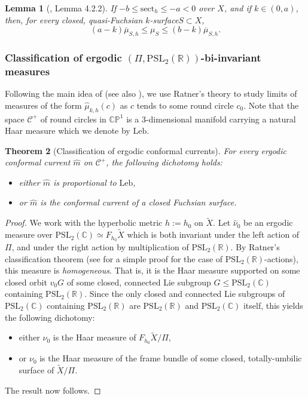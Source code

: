 \documentclass[11pt]{article}
\newcommand{\ksurface}{$k$\nobreakdash-surface\xspace}
\theoremstyle{plain}
\newtheorem{theorem}{Theorem}[section]
\newtheorem{lemma}[theorem]{Lemma}
\theoremstyle{definition}
\newcommand\PSL{\mathrm{PSL}_2(\mathbb{R})}
\newcommand\PSLc{\mathrm{PSL}_2(\mathbb{C})}
\newcommand\CP{\C\PP^1}
\newcommand{\C}{{\mathbb C}}
\newcommand{\PP}{{\mathbb P}}
\newcommand{\cC}{{\mathcal C}}
\let\dans\subset
\newcommand{\Leb}{\mathrm{Leb}}
\newcommand{\sect}{\mathrm{sect}}
\begin{document}
\begin{lemma}[\cite{ALS}, Lemma 4.2.2]\label{lem_comparison_area_laminar}
If $-b\leq \sect_h\leq -a<0$ over $X$, and if $k\in(0,a)$, then, for every closed, quasi-Fuchsian \ksurface $S\dans X$,
\begin{equation*}
(a-k)\overline{\mu}_{S,h}\leq\mu_S\leq(b-k)\overline{\mu}_{S,h}.
\end{equation*}
\end{lemma}

\subsubsection{Classification of ergodic $(\Pi,\PSL)$-bi-invariant measures}

Following the main idea of \cite{CMN} (see also \cite{LabourieBourbaki}), we use Ratner's theory to study limits of measures of the form $\hat\mu_{k,h}(c)$ as $c$ tends to some round circle $c_0$. Note that the space $\cC^+$ of round circles in $\CP$ is a $3$\nobreakdash-dimensional manifold carrying a natural Haar measure which we denote by $\Leb$.

\begin{theorem}[Classification of ergodic conformal currents]
\label{thm.Ratner} For every ergodic conformal current $\hat m$ on $\cC^+$, the following dichotomy holds:
\begin{itemize}
\item either $\hat m$ is proportional to $\Leb$,
\item or $\hat m$ is the conformal current of a closed Fuchsian surface.
\end{itemize}
\end{theorem}

\begin{proof}
We work with the hyperbolic metric $h:=h_0$ on $\tilde{X}$. Let $\hat\nu_0$ be an ergodic measure over $\PSLc\simeq F_{h_0}\tilde{X}$ which is both invariant under the left action of $\Pi$, and under the right action by multiplication of $\PSL$. By Ratner's classification theorem \cite{Ratner_Duke} (see \cite{Einsiedler} for a simple proof for the case of $\PSL$-actions), this measure is \emph{homogeneous}. That is, it is the Haar measure supported on some closed orbit $v_0G$ of some closed, connected Lie subgroup $G\leq\PSLc$ containing $\PSL$. Since the only closed and connected Lie subgroups of $\PSLc$ containing $\PSL$ are $\PSL$ and $\PSLc$ itself, this yields the following dichotomy:
\begin{itemize}
\item either $\nu_0$ is the Haar measure of $F_{h_0}\tilde X/\Pi$,
\item or $\nu_0$ is the Haar measure of the frame bundle of some closed, totally-umbilic surface of $\tilde X/\Pi$.
\end{itemize}
The result now follows.
\end{proof}
\end{document}
